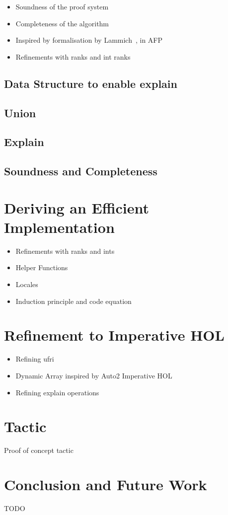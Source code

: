 \documentclass[
  sigplan,
  10pt,
  anonymous,
  review,
  ]{acmart}
\begin{document}
\begin{itemize}
  \item Soundness of the proof system
  \item Completeness of the algorithm
\end{itemize}

\begin{itemize}
  \item Inspired by formalisation by Lammich~\cite{unionfind_isabelle}, in AFP~\cite{union_find_afp}
  \item Refinements with ranks and int ranks
\end{itemize}

\subsection{Data Structure to enable explain}

\subsection{Union}

\subsection{Explain}

\subsection{Soundness and Completeness}

\section{Deriving an Efficient Implementation}
\begin{itemize}
  \item Refinements with ranks and ints
  \item Helper Functions
  \item Locales
  \item Induction principle and code equation
\end{itemize}

\section{Refinement to Imperative HOL}
\begin{itemize}
  \item Refining ufri
  \item Dynamic Array inspired by Auto2 Imperative HOL
  \item Refining explain operations
\end{itemize}

\section{Tactic}
Proof of concept tactic

\section{Conclusion and Future Work}

\begin{acks}
  TODO
\end{acks}



\end{document}
